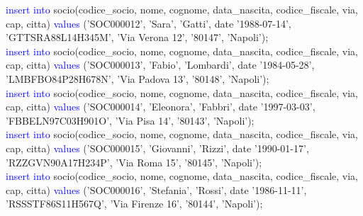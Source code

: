 \documentclass{article}
\begin{document}
\begin{flushleft}
{        \vspace{2mm}
        \hspace*{0.5em}\textcolor{blue}{insert into} socio(codice\_socio, nome, cognome, data\_nascita, codice\_fiscale, via, \hspace*{0.5em}cap, citta) \textcolor{blue}{values} ('SOC000012', 'Sara', 'Gatti', date '1988-07-14', \hspace*{0.4em}'GTTSRA88L14H345M', 'Via Verona 12', '80147', 'Napoli'); \\
        \vspace{2mm}
        \hspace*{0.5em}\textcolor{blue}{insert into} socio(codice\_socio, nome, cognome, data\_nascita, codice\_fiscale, via, \hspace*{0.5em}cap, citta) \textcolor{blue}{values} ('SOC000013', 'Fabio', 'Lombardi', date '1984-05-28', \hspace*{0.4em}'LMBFBO84P28H678N', 'Via Padova 13', '80148', 'Napoli'); \\
        \vspace{2mm}
        \hspace*{0.5em}\textcolor{blue}{insert into} socio(codice\_socio, nome, cognome, data\_nascita, codice\_fiscale, via, \hspace*{0.5em}cap, citta) \textcolor{blue}{values} ('SOC000014', 'Eleonora', 'Fabbri', date '1997-03-03', \hspace*{0.4em}'FBBELN97C03H901O', 'Via Pisa 14', '80143', 'Napoli'); \\
        \vspace{2mm}
        \hspace*{0.5em}\textcolor{blue}{insert into} socio(codice\_socio, nome, cognome, data\_nascita, codice\_fiscale, via, \hspace*{0.5em}cap, citta) \textcolor{blue}{values} ('SOC000015', 'Giovanni', 'Rizzi', date '1990-01-17', \hspace*{0.4em}'RZZGVN90A17H234P', 'Via Roma 15', '80145', 'Napoli'); \\
        \vspace{2mm}
        \hspace*{0.5em}\textcolor{blue}{insert into} socio(codice\_socio, nome, cognome, data\_nascita, codice\_fiscale, via, \hspace*{0.5em}cap, citta) \textcolor{blue}{values} ('SOC000016', 'Stefania', 'Rossi', date '1986-11-11', \hspace*{0.4em}'RSSSTF86S11H567Q', 'Via Firenze 16', '80144', 'Napoli'); \\
}
\end{flushleft}
\end{document}
